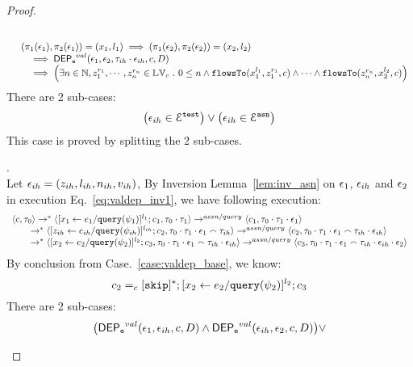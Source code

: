 \begin{proof}
\begin{case}
$$\begin{array}{l}
\\ \quad
(\pi_{1}{(\mathtt{\epsilon}_1)}, \pi_{2}{(\mathtt{\epsilon}_1)}) = ({x}_1, l_1)
\implies
(\pi_{1}{(\mathtt{\epsilon}_2)}, \pi_{2}{(\mathtt{\epsilon}_2)}) = ({x}_2, l_2)
 \\ \qquad \implies 
\mathsf{DEP_{\mathtt{e}}}^{val}(\mathtt{\epsilon}_1, \mathtt{\epsilon}_2, \mathtt{\tau}_{ih} \cdot \mathtt{\epsilon}_{ih}, c, D)
 \\ \qquad \implies
   \Big(\exists  n \in \mathbb{N}, z_1^{r_1}, \cdots, z_n^{r_n} \in \mathbb{LV}_{{c}} ~.~ 0 \leq n
 \land \mathtt{flowsTo}(x_1^{l_1}, z_1^{r_1}, c) \land \cdots \land \mathtt{flowsTo}(z_n^{r_n}, {x}_2^{l_2}, c) \Big)
\end{array}
$$
%
There are 2 sub-cases: 
%
 \[
 \big(\mathtt{\epsilon}_{ih} \in \mathcal{E}^{\mathtt{{test}}}\big) \lor \big(\mathtt{\epsilon}_{ih} \in \mathcal{E}^{\mathtt{{asn}}}\big)
 \]
%
This case is proved by splitting the 2 sub-cases.
%
\begin{subcase}.
\label{case:valdep_ihasn}
%
\\
Let $\mathtt{\epsilon}_{ih} = (z_{ih}, l_{ih}, n_{ih}, v_{ih})$, 
%
By Inversion Lemma~\ref{lem:inv_asn} on $\mathtt{\epsilon}_1$, $\mathtt{\epsilon}_{ih}$ and $\mathtt{\epsilon}_2$ in execution Eq.~\ref{eq:valdep_inv1}, we have following execution:
\begin{equation}
\label{eq:m1asn_inv1}
  \begin{array}{l}   
\langle {c}, \mathtt{\tau}_0 \rangle \rightarrow^{*} 
\langle [\mathrel{ {x}_1 \leftarrow e_1 / {\tt query}(\psi_1) }]^{l_1} ; {c}_1, \mathtt{\tau}_0 \cdot \mathtt{\tau}_1 \rangle  \rightarrow^{assn/query}
 \langle c_1, \mathtt{\tau}_0 \cdot \mathtt{\tau}_1 \cdot \mathtt{\epsilon}_1 \rangle \\
  \qquad \rightarrow^{*} 
  \langle [\mathrel{ z_{ih} \leftarrow e_{ih} / {\tt query}(\psi_{ih}) }]^{l_{ih}};{c}_2, 
  \mathtt{\tau}_0 \cdot \mathtt{\tau}_1 \cdot \mathtt{\epsilon}_1 \smallfrown \mathtt{\tau}_{ih} \rangle 
  \rightarrow^{assn/query} 
  \langle {c}_2,  \mathtt{\tau}_0 \cdot \mathtt{\tau}_1 \cdot \mathtt{\epsilon}_1 \smallfrown \mathtt{\tau}_{ih} \cdot \mathtt{\epsilon}_{ih} \rangle  \\
  \qquad \rightarrow^{*} 
  \langle [\mathrel{ {x}_2 \leftarrow e_2 / {\tt query}(\psi_2) }]^{l_2};{c}_3, 
  \mathtt{\tau}_0 \cdot \mathtt{\tau}_1 \cdot \mathtt{\epsilon}_1  \smallfrown \mathtt{\tau}_{ih} \cdot \mathtt{\epsilon}_{ih} \rangle 
  \rightarrow^{assn/query} 
  \langle {c}_3,  \mathtt{\tau}_0 \cdot \mathtt{\tau}_1 \cdot \mathtt{\epsilon}_1  \smallfrown \mathtt{\tau}_{ih} \cdot \mathtt{\epsilon}_{ih} \cdot \mathtt{\epsilon}_2 \rangle 
\end{array}
 \end{equation}
By conclusion from Case.~\ref{case:valdep_base}, we know:
\[
 c_2 =_c [\mathtt{skip}]{}^*; [\mathrel{ {x}_2 \leftarrow e_2 / {\tt query}(\psi_2) }]^{l_2};{c}_3
 \]
 There are 2 sub-cases:
%
\[
\big(\mathsf{DEP_{\mathtt{e}}}^{val}(\mathtt{\epsilon}_1, \mathtt{\epsilon}_{ih}, c, D) \land 
\mathsf{DEP_{\mathtt{e}}}^{val}(\mathtt{\epsilon}_{ih}, \mathtt{\epsilon}_2, c, D)\big) \lor 
\]
\end{subcase}
\end{case}
\end{proof}
